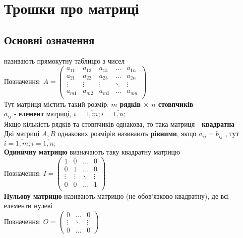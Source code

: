 \documentclass[a4paper, 10pt]{article}
\theoremstyle{theoremdd}
\begin{document}
\section{Трошки про матриці}
    	\subsection{Основні означення}
    	 називають прямокутну таблицю з чисел\\
    	Позначення: $A = \begin{pmatrix}
    	a_{11} & a_{12} & a_{13} & \dots & a_{1n} \\
    	a_{21} & a_{22} & a_{23} & \dots & a_{2n} \\
    	\vdots & \vdots & \vdots & \ddots & \vdots\\
    	a_{m1} & a_{m2} & a_{m3} & \dots & a_{mn} \\
    	\end{pmatrix}$\\
    	Тут матриця містить такий розмір: \textbf{$m$ рядків $\times$ $n$ стовпчиків}\\
    	$a_{ij}$ - \textbf{елемент} матриці, $i=\overline{1,m}; i=\overline{1,n};$
    	\bigskip \\
    	Якщо кількість рядків та стовпчиків однакова, то така матриця - \textbf{квадратна}
    	\bigskip \\
    	 Дві матриці $A,B$ однакових розмірів називають \textbf{рівними}, якщо $a_{ij} = b_{ij}$ , тут $i=\overline{1,m}; i=\overline{1,n};$\bigskip \\
    	 \textbf{Одиничну матрицю} визначають таку квадратну матрицю\\
    	Позначення: $I = \begin{pmatrix}
    	1 & 0 & \dots & 0 \\
    	0 & 1 & \dots & 0 \\
    	\vdots & \vdots & \ddots & \vdots \\
    	0 & 0 & \dots & 1 \\
    	\end{pmatrix}$
    	\bigskip \\
    	 \textbf{Нульову матрицю} називають матрицю (не обов'язково квадратну), де всі елементи нулеві\\
    	Позначення: $O = \begin{pmatrix}
    	0 & \dots & 0 \\
    	\vdots & \ddots & \vdots \\
    	0 & \dots & 0
    	\end{pmatrix}$
\end{document}
